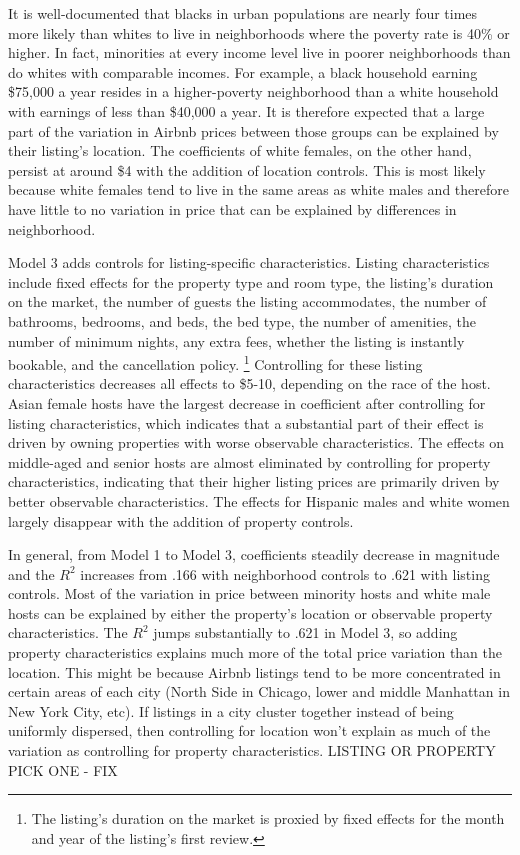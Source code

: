 It is well-documented that blacks in urban populations are nearly four times more likely than whites to live in neighborhoods where the poverty rate is 40\% or higher.\cite{firebaugh} In fact, minorities at every income level live in poorer neighborhoods than do whites with comparable incomes. For example, a black household earning \$75,000 a year resides in a higher-poverty neighborhood than a white household with earnings of less than \$40,000 a year.\cite{logan} It is therefore expected that a large part of the variation in Airbnb prices between those groups can be explained by their listing's location. The coefficients of white females, on the other hand, persist at around \$4 with the addition of location controls. This is most likely because white females tend to live in the same areas as white males and therefore have little to no variation in price that can be explained by differences in neighborhood.  

Model 3 adds controls for listing-specific characteristics. Listing characteristics include fixed effects for the property type and room type, the listing's duration on the market, the number of guests the listing accommodates, the number of bathrooms, bedrooms, and beds, the bed type, the number of amenities, the number of minimum nights, any extra fees, whether the listing is instantly bookable, and the cancellation policy.%
	\footnote{The listing's duration on the market is proxied by fixed effects for the month and year of the listing's first review.}
Controlling for these listing characteristics decreases all effects to \$5-10, depending on the race of the host. Asian female hosts have the largest decrease in coefficient after controlling for listing characteristics, which indicates that a substantial part of their effect is driven by owning properties with worse observable characteristics. The effects on middle-aged and senior hosts are almost eliminated by controlling for property characteristics, indicating that their higher listing prices are primarily driven by better observable characteristics. The effects for Hispanic males and white women largely disappear with the addition of property controls. 

In general, from Model 1 to Model 3, coefficients steadily decrease in magnitude and the $R^2$ increases from .166 with neighborhood controls to .621 with listing controls. Most of the variation in price between minority hosts and white male hosts can be explained by either the property's location or observable property characteristics. The $R^2$ jumps substantially to .621 in Model 3, so adding property characteristics explains much more of the total price variation than the location. This might be because Airbnb listings tend to be more concentrated in certain areas of each city (North Side in Chicago, lower and middle Manhattan in New York City, etc). If listings in a city cluster together instead of being uniformly dispersed, then controlling for location won't explain as much of the variation as controlling for property characteristics. LISTING OR PROPERTY PICK ONE - FIX

